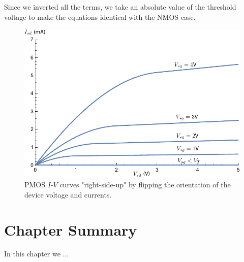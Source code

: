 Since we inverted all the terms, we take an absolute value of the threshold voltage to make the equations identical with the NMOS case.  
\begin{figure}[tb]
\centering
\includegraphics[width=.75\columnwidth]{ids_pmos_negative}
\caption{PMOS $I$-$V$ curves "right-side-up" by flipping the orientation of the device voltage and currents.}
\label{fig:ids_pmos_negative}
\end{figure}
\newpage
\section{Chapter Summary}
In this chapter we ...
